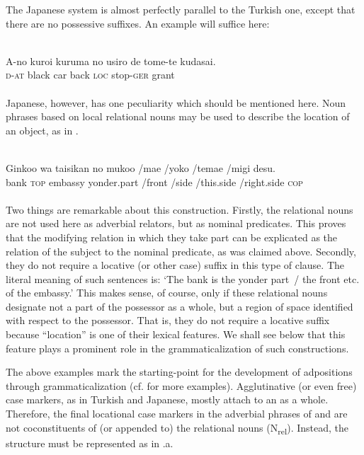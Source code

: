 The Japanese system is almost perfectly parallel to the Turkish one, except that there are no possessive suffixes. An example will suffice here:

\ea\label{ex:E51}
 \\
\gll A-no  kuroi  kuruma  no  usiro  de  tome-te  kudasai.\\
\textsc{d}-\textsc{at}  black  car  {\glgen}  back  \textsc{loc}  stop-\textsc{ger}  grant\\
\\
\z
\noindent Japanese, however, has one peculiarity which should be mentioned here. Noun phrases based on local relational nouns may be used to describe the location of an object, as in .

\ea\label{ex:E52}
 \\
\gll  Ginkoo  wa  taisikan  no  mukoo  /mae  /yoko  /temae  /migi  desu.\\
bank  \textsc{top}  embassy  {\glgen}  yonder.part  /front  /side  /this.side  /right.side  \textsc{cop}\\
\\
\z
\noindent Two things are remarkable about this construction. Firstly, the relational nouns are not used here as adverbial relators, but as nominal predicates. This proves that the modifying relation in which they take part can be explicated as the relation of the subject to the nominal predicate, as was claimed above. Secondly, they do not require a locative (or other case) suffix in this type of clause. The literal meaning of such sentences is: ‘The bank is the yonder part~/ the front etc. of the embassy.’ This makes sense, of course, only if these relational nouns designate not a part of the possessor as a whole, but a region of space identified with respect to the possessor. That is, they do not require a locative suffix because ``location'' is one of their lexical features. We shall see below that this feature plays a prominent role in the grammaticalization of such constructions.

The above examples mark the starting-point for the development of adpositions through grammaticalization (cf. \citealt[446, fn 5]{MallinsonEtAl1981} for more examples). Agglutinative (or even free) case markers, as in Turkish and Japanese, mostly attach to an \np as a whole. Therefore, the final locational case markers in the adverbial phrases of  and  are not coconstituents of (or appended to) the relational nouns (N\textsubscript{rel}). Instead, the structure must be represented as in .a.

